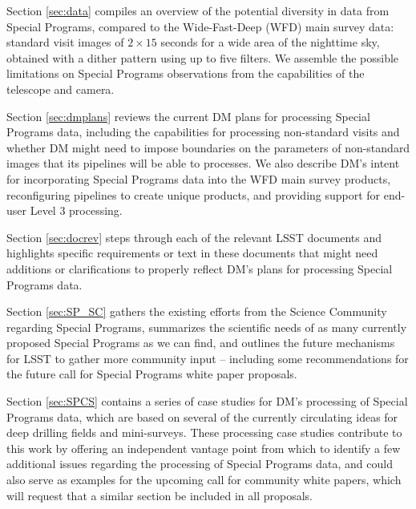 \documentclass[DM,lsstdraft,toc]{lsstdoc}
\begin{document}
Section \ref{sec:data} compiles an overview of the potential diversity in data from Special Programs, compared to the Wide-Fast-Deep (WFD) main survey data: standard visit images of $2\times15$ seconds for a wide area of the nighttime sky, obtained with a dither pattern using up to five filters. We assemble the possible limitations on Special Programs observations from the capabilities of the telescope and camera.

Section \ref{sec:dmplans} reviews the current DM plans for processing Special Programs data, including the capabilities for processing non-standard visits and whether DM might need to impose boundaries on the parameters of non-standard images that its pipelines will be able to processes. We also describe DM's intent for incorporating Special Programs data into the WFD main survey products, reconfiguring pipelines to create unique products, and providing support for end-user Level 3 processing.

Section \ref{sec:docrev} steps through each of the relevant LSST documents and highlights specific requirements or text in these documents that might need additions or clarifications to properly reflect DM's plans for processing Special Programs data.

Section \ref{sec:SP_SC} gathers the existing efforts from the Science Community regarding Special Programs, summarizes the scientific needs of as many currently proposed Special Programs as we can find, and outlines the future mechanisms for LSST to gather more community input -- including some recommendations for the future call for Special Programs white paper proposals.

Section \ref{sec:SPCS} contains a series of case studies for DM's processing of Special Programs data, which are based on several of the currently circulating ideas for deep drilling fields and mini-surveys. These processing case studies contribute to this work by offering an independent vantage point from which to identify a few additional issues regarding the processing of Special Programs data, and could also serve as examples for the upcoming call for community white papers, which will request that a similar section be included in all proposals.
\end{document}

